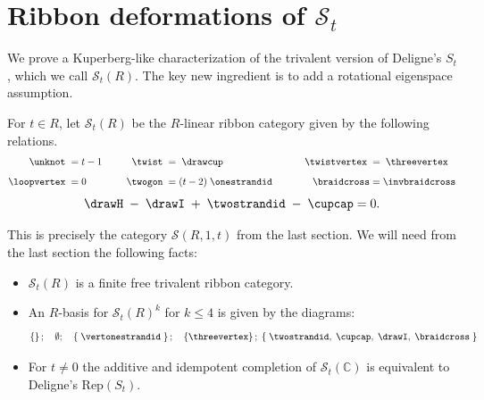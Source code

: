 \documentclass[12pt]{amsart}
\begin{document}
%



\section{Ribbon deformations of \texorpdfstring{$\mathcal{S}_t$}{S t}} \label{sec:StDeformations}

We prove a Kuperberg-like characterization of the trivalent version of Deligne's $S_t$, which we call $\mathcal{S}_t(R)$. The key new ingredient is to add a rotational eigenspace assumption.

\begin{definition}
For $t \in R$, let $\mathcal{S}_t(R)$ be the $R$-linear ribbon category given by the following relations.
\begin{align*}
    \unknot\; &= t-1 &\qquad
      \twist\; &=  \;\drawcup&\qquad
        \twistvertex\; &=  \;\threevertex\\[5pt] 
    \loopvertex\;&=0&
      \twogon\;&= (t-2) \;\onestrandid \; & \braidcross &= \invbraidcross 
\end{align*}
\vspace{5pt}
\[\drawH \; - \; \drawI \; +  \;\twostrandid \; -  \; \cupcap = 0.\]
\end{definition}

This is precisely the category $\mathcal{S}(R,1,t)$ from the last section. We will need from the last section the following facts:

\begin{itemize}
    \item $\mathcal{S}_t(R)$ is a finite free trivalent ribbon category.
    \item An $R$-basis for $\mathcal{S}_t(R)^k$ for $k \leq 4$ is given by the diagrams:
    \begin{equation*}
        \left\{ \right\}; \quad \emptyset; \quad 
        \left\{\; \vertonestrandid \; \right\}; \quad
        \left\{\threevertex\right\}; \;
        \left\{\;   \twostrandid,\; \cupcap,\; \drawI,\; \braidcross \;\right\}
    \end{equation*}
    \item For $t \neq 0$ the additive and idempotent completion of $\mathcal{S}_t(\mathbb{C})$ is equivalent to Deligne's $\mathrm{Rep}(S_t)$.
\end{itemize}
\end{document}
